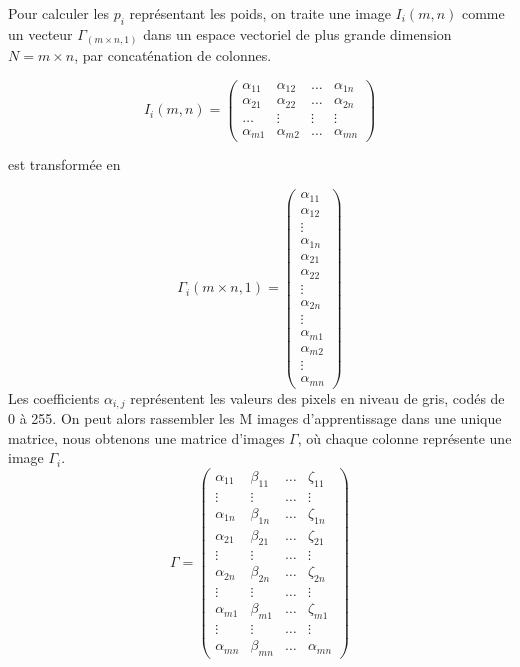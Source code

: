 Pour calculer les $p_i$ représentant les poids, on traite une image $I_i(m,n)$ comme un vecteur $\Gamma_(m\times n,1)$ dans un espace vectoriel de plus grande dimension $N=m \times n$, par concaténation de colonnes.

\[
   I_i(m,n)=\begin{pmatrix}
\alpha_{11} & \alpha_{12}& \ldots & \alpha_{1n}\\
\alpha_{21} & \alpha_{22}& \ldots & \alpha_{2n}\\
\ldots& \vdots& \vdots & \vdots        \\
\alpha_{m1} & \alpha_{m2}& \ldots & \alpha_{mn}
\end{pmatrix}\]

est transformée en

\[\Gamma_i(m\times n,1)= \begin{pmatrix}
\alpha_{11} \\
\alpha_{12} \\
\vdots     \\
\alpha_{1n}   \\
\alpha_{21}   \\
\alpha_{22}  \\
\vdots   \\
\alpha_{2n}  \\
\vdots        \\
\alpha_{m1} \\
\alpha_{m2}\\
\vdots \\
\alpha_{mn}
\end{pmatrix} 
\]
Les coefficients $\alpha_{i,j}$ représentent les valeurs des pixels en niveau de gris, codés de 0 à 255.
On peut alors rassembler les M images d'apprentissage dans une unique matrice, nous obtenons une matrice d'images $\Gamma$, où chaque colonne représente une image $\Gamma_i$.
\[\Gamma= \begin{pmatrix}
\alpha_{11} &\beta_{11} &\ldots&\zeta_{11}\\
\vdots      &\vdots     &\ldots&\vdots\\
\alpha_{1n} &\beta_{1n}&\ldots&\zeta_{1n} \\
\alpha_{21} &\beta_{21} &\ldots&\zeta_{21} \\
\vdots      &\vdots     &\ldots& \vdots  \\
\alpha_{2n} &\beta_{2n} &\ldots&\zeta_{2n} \\
\vdots      & \vdots    &\ldots&\vdots    \\
\alpha_{m1} &\beta_{m1} &\ldots&\zeta_{m1} \\
\vdots      &\vdots     &\ldots&\vdots \\
\alpha_{mn} &\beta_{mn} &\ldots&\alpha_{mn}
\end{pmatrix} 
\]

